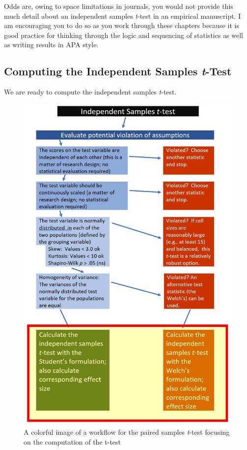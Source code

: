 \documentclass[
  11pt,
]{book}
\begin{document}
Odds are, owing to space limitations in journals, you would not provide this much detail about an independent samples \emph{t}-test in an empirical manuscript. I am encouraging you to do so as you work through these chapters because it is good practice for thinking through the logic and sequencing of statistics as well as writing results in APA style.

\hypertarget{computing-the-independent-samples-t-test}{%
\subsection{\texorpdfstring{Computing the Independent Samples \emph{t}-Test}{Computing the Independent Samples t-Test}}\label{computing-the-independent-samples-t-test}}

We are ready to compute the independent samples \emph{t}-test.

\begin{figure}
\centering
\includegraphics{images/ttests/IntSampT.jpg}
\caption{A colorful image of a workflow for the paired samples \emph{t}-test focusing on the computation of the t-test}
\end{figure}
\end{document}
